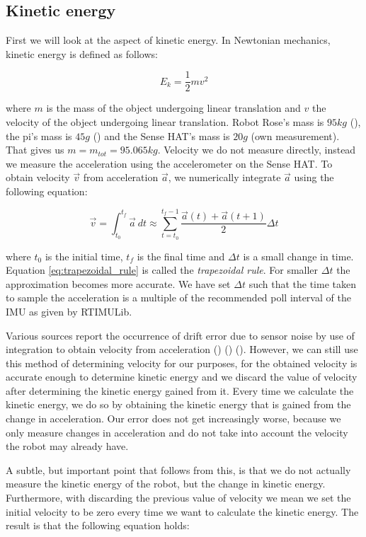 \documentclass[12pt]{scrreprt}
\begin{document}
\subsection{Kinetic energy}
\label{Kinetic energy}
First we will look at the aspect of kinetic energy. In Newtonian mechanics, kinetic energy is defined as follows:

\begin{equation} \label{eq:ke}
    E_k = \frac{1}{2}mv^2
\end{equation}

where $m$ is the mass of the object undergoing linear translation and $v$ the velocity of the object undergoing linear translation. Robot Rose's mass is $95kg$ (\cite{rose_specification}), the \gls{pi}'s mass is $45g$ (\cite{raspberry_pi_weight}) and the Sense HAT's mass is $20g$ (own measurement). That gives us $m = m_{tot} = 95.065kg$. Velocity we do not measure directly, instead we measure the acceleration using the accelerometer on the Sense HAT. To obtain velocity $\vec{v}$ from acceleration $\vec{a}$, we numerically integrate $\vec{a}$ using the following equation:

\begin{equation} \label{eq:trapezoidal_rule}
    \vec{v} = \int_{t_0}^{t_f} \vec{a}\ dt \approx \sum_{t=t_0}^{t_f-1} \frac{\vec{a}(t) + \vec{a}(t+1)}{2}\Delta t
\end{equation}

where $t_0$ is the initial time, $t_f$ is the final time and $\Delta t$ is a small change in time. Equation \ref{eq:trapezoidal_rule} is called the \textit{trapezoidal rule}. For smaller $\Delta t$ the approximation becomes more accurate. We have set $\Delta t$ such that the time taken to sample the acceleration is a multiple of the recommended poll interval of the IMU as given by RTIMULib.
\par
Various sources report the occurrence of drift error due to sensor noise by use of integration to obtain velocity from acceleration (\cite{chrobotics}) (\cite{googletechtalks}) (\cite{Woodman07anintroduction_oliver}). However, we can still use this method of determining velocity for our purposes, for the obtained velocity is accurate enough to determine kinetic energy and we discard the value of velocity after determining the kinetic energy gained from it. Every time we calculate the kinetic energy, we do so by obtaining the kinetic energy that is gained from the change in acceleration. Our error does not get increasingly worse, because we only measure changes in acceleration and do not take into account the velocity the robot may already have.
\par
A subtle, but important point that follows from this, is that we do not actually measure the kinetic energy of the robot, but the change in kinetic energy. Furthermore, with discarding the previous value of velocity we mean we set the initial velocity to be zero every time we want to calculate the kinetic energy. The result is that the following equation holds:
\\\\
\end{document}
